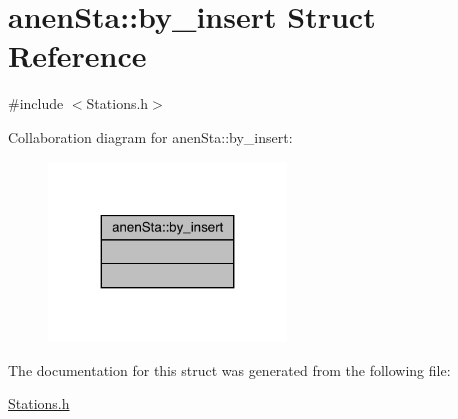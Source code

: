 \hypertarget{structanen_sta_1_1by__insert}{}\section{anen\+Sta\+:\+:by\+\_\+insert Struct Reference}
\label{structanen_sta_1_1by__insert}


{\ttfamily \#include $<$Stations.\+h$>$}



Collaboration diagram for anen\+Sta\+:\+:by\+\_\+insert\+:\nopagebreak
\begin{figure}[H]
\begin{center}
\leavevmode
\includegraphics[width=179pt]{structanen_sta_1_1by__insert__coll__graph}
\end{center}
\end{figure}


The documentation for this struct was generated from the following file\+:\begin{DoxyCompactItemize}
\item 
\mbox{\hyperlink{_stations_8h}{Stations.\+h}}\end{DoxyCompactItemize}

